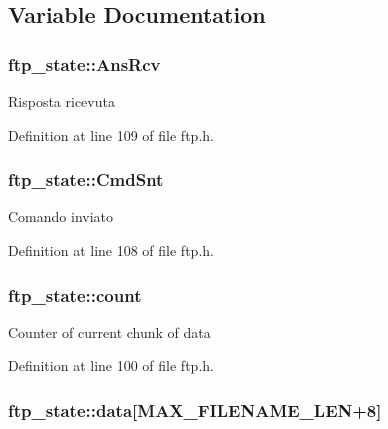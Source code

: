 \subsection{Variable Documentation}
\hypertarget{group__ftp_ga4308157292a9948553f531a8b4f78c67}{
\subsubsection[{AnsRcv}]{ {\bf ftp\_\-state::AnsRcv}}}
\label{group__ftp_ga4308157292a9948553f531a8b4f78c67}
Risposta ricevuta 

Definition at line 109 of file ftp.h.

\hypertarget{group__ftp_ga44d3b63ea7baa07d6743e145f06d2589}{
\subsubsection[{CmdSnt}]{ {\bf ftp\_\-state::CmdSnt}}}
\label{group__ftp_ga44d3b63ea7baa07d6743e145f06d2589}
Comando inviato 

Definition at line 108 of file ftp.h.

\hypertarget{group__ftp_ga705b43b8713c16ed6c2375f7cbb88f21}{
\subsubsection[{count}]{ {\bf ftp\_\-state::count}}}
\label{group__ftp_ga705b43b8713c16ed6c2375f7cbb88f21}
Counter of current chunk of data 

Definition at line 100 of file ftp.h.

\hypertarget{group__ftp_ga3b5f7f0b0f4175c56c7107cfdb51d1ea}{
\subsubsection[{data}]{ {\bf ftp\_\-state::data}\mbox{[}MAX\_\-FILENAME\_\-LEN+8\mbox{]}}}
\label{group__ftp_ga3b5f7f0b0f4175c56c7107cfdb51d1ea}



